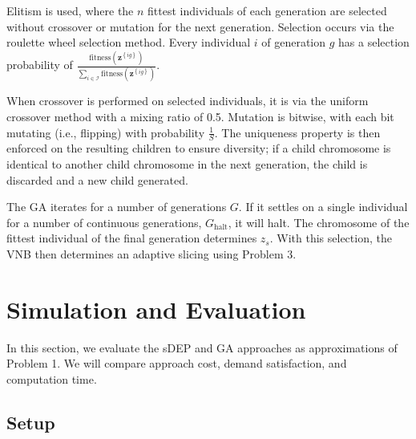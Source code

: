 \documentclass[conference]{IEEEtran}
\begin{document}
Elitism is used, where the $n$ fittest individuals of each generation are selected without crossover or mutation for the next generation.  Selection occurs via the roulette wheel selection method.  Every individual $i$ of generation $g$ has a selection probability of $\frac{\text{fitness}\left( \textbf{z}^{\left\{ ig \right\}} \right)}{\sum_{i \in \mathcal{I}} \text{fitness}\left( \textbf{z}^{\left\{ ig \right\}} \right)}$.

When crossover is performed on selected individuals, it is via the uniform crossover method with a mixing ratio of 0.5.  Mutation is bitwise, with each bit mutating (i.e., flipping) with probability $\frac{1}{S}$.  The uniqueness property is then enforced on the resulting children to ensure diversity; if a child chromosome is identical to another child chromosome in the next generation, the child is discarded and a new child generated.

The GA iterates for a number of generations $G$.  If it settles on a single individual for a number of continuous generations, $G_\text{halt}$, it will halt.  The chromosome of the fittest individual of the final generation determines $z_s$.  With this selection, the VNB then determines an adaptive slicing using Problem 3.

\section{Simulation and Evaluation} \label{sec:sim}

In this section, we evaluate the sDEP and GA approaches as approximations of Problem 1.  We will compare approach cost, demand satisfaction, and computation time.

\subsection{Setup} \label{subsec:setup}
\end{document}
